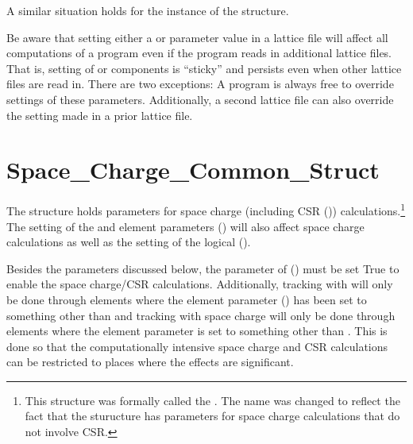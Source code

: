 {A similar situation holds for the  instance of the  structure.

Be aware that setting either a  or  parameter value in a lattice file will
affect all computations of a program even if the program reads in additional lattice files. That is,
setting of  or  components is ``sticky'' and persists even when other
lattice files are read in. There are two exceptions: A program is always free to override settings
of these parameters.  Additionally, a second lattice file can also override the setting made in a
prior lattice file.

\section{Space_Charge_Common_Struct}
\label{s:sc.com}

The  structure holds parameters for space charge (including CSR
()) calculations.\footnote
  {
This structure was formally called the . The name was changed to reflect
the fact that the sturucture has parameters for space charge calculations that do not involve CSR.
  }
The setting of the  and  element parameters
() will also affect space charge calculations as well as the setting of the
 logical  ().

Besides the parameters discussed below, the  parameter of 
() must be set True to enable the space charge/CSR calculations. Additionally,
tracking with  will only be done through elements where the element parameter
 () has been set to something other than  and tracking with
space charge will only be done through elements where the element parameter 
is set to something other than . This is done so that the computationally intensive space
charge and CSR calculations can be restricted to places where the effects are significant.

}
